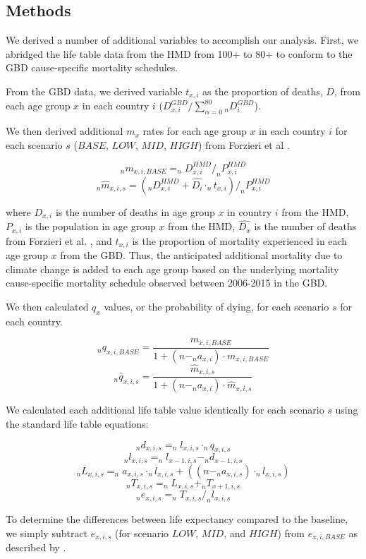 \documentclass[12pt,]{article}
\begin{document}
\subsection{Methods}\label{methods-1}

We derived a number of additional variables to accomplish our analysis.
First, we abridged the life table data from the HMD from 100+ to 80+ to
conform to the GBD cause-specific mortality schedules.

From the GBD data, we derived variable \(t_{x,i}\) as the proportion of
deaths, \(D\), from each age group \(x\) in each country \(i\)
(\(D_{x,i}^{GBD}/\sum_{\alpha=0}^{80}{_nD_i^{GBD}}\)).

We then derived additional \(m_x\) rates for each age group \(x\) in
each country \(i\) for each scenario \(s\) (\(BASE\), \(LOW\), \(MID\),
\(HIGH\)) from Forzieri et al \citep{forzieri2017increasing}.

\[ _nm_{x,i,BASE} = _nD_{x,i}^{HMD} / _nP_{x,i}^{HMD} \]
\[ _n\hat{m}_{x,i,s} = (_nD_{x,i}^{HMD} + \hat{D_i} \cdot _nt_{x,i} ) / _nP_{x,i}^{HMD} \]

where \(D_{x,i}\) is the number of deaths in age group \(x\) in country
\(i\) from the HMD, \(P_{x,i}\) is the population in age group \(x\)
from the HMD, \(\hat{D_x}\) is the number of deaths from Forzieri et al.
\citep{forzieri2017increasing}, and \(t_{x,i}\) is the proportion of
mortality experienced in each age group \(x\) from the GBD. Thus, the
anticipated additional mortality due to climate change is added to each
age group based on the underlying mortality cause-specific mortality
schedule observed between 2006-2015 in the GBD.

We then calculated \(q_x\) values, or the probability of dying, for each
scenario \(s\) for each country.

\[_nq_{x,i,BASE} = \frac{m_{x,i,BASE}}{1+(n-_na_{x,i}) \cdot m_{x,i,BASE}}\]
\[_n\hat{q}_{x,i,s} = \frac{\hat{m}_{x,i,s}}{1+(n-_na_{x,i}) \cdot \hat{m}_{x,i,s}}\]

We calculated each additional life table value identically for each
scenario \(s\) using the standard life table equations:

\[_nd_{x,i,s} = _nl_{x,i,s} \cdot _nq_{x,i,s}\]
\[_nl_{x,i,s} = _nl_{x-1,i,s} - _nd_{x-1,i,s}\]
\[_nL_{x,i,s} = _na_{x,i,s} \cdot _nl_{x,i,s} + ((n-_na_{x,i,s}) \cdot _nl_{x,i,s})\]
\[_nT_{x,i,s} = _nL_{x,i,s} + _nT_{x+1,i,s}\]
\[_ne_{x,i,s} = _nT_{x,i,s} / _nl_{x,i,s}\]

To determine the differences between life expectancy compared to the
baseline, we simply subtract \(e_{x,i,s}\) (for scenario \(LOW\),
\(MID\), and \(HIGH\)) from \(e_{x,i,BASE}\) as described by
\citep{beltran2008integrated}.
\newpage
\singlespacing 

\end{document}

